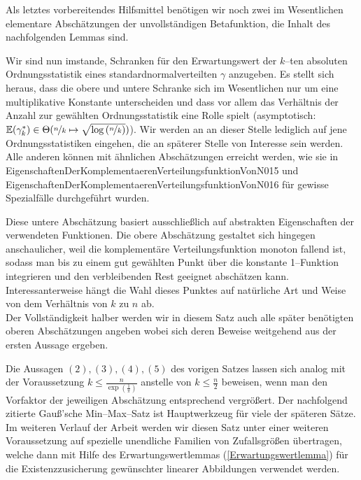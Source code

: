 \documentclass[a4paper]{report}
\numberwithin[\roman]{equation}{sat}
\begin{document}

\parag
Als letztes vorbereitendes Hilfsmittel benötigen wir noch zwei im Wesentlichen
elementare Abschätzungen der unvollständigen Betafunktion, die Inhalt des
nachfolgenden Lemmas sind.


\parag
Wir sind nun imstande, Schranken für den Erwartungswert der $k$--ten absoluten
Ordnungsstatistik eines standardnormalverteilten $\gamma$ anzugeben.
Es stellt sich heraus, dass die obere und untere Schranke sich im Wesentlichen nur um
eine multiplikative Konstante unterscheiden und dass vor allem das Verhältnis
der Anzahl zur gewählten Ordnungsstatistik eine Rolle spielt (asymptotisch:
$\mathbb{E}(\gamma_k^\ast) \in \Theta(\nicefrac n k \mapsto
\sqrt{\log\left(\nicefrac n k \right)})$). Wir werden an
an dieser Stelle lediglich auf jene Ordnungsstatistiken eingehen, die an
späterer Stelle von Interesse sein werden. Alle anderen können mit ähnlichen
Abschätzungen erreicht werden, wie sie in
{EigenschaftenDerKomplementaerenVerteilungsfunktionVonN015} und
{EigenschaftenDerKomplementaerenVerteilungsfunktionVonN016} für gewisse
Spezialfälle durchgeführt wurden.


\parag
Diese untere Abschätzung basiert ausschließlich auf abstrakten Eigenschaften
der verwendeten Funktionen. Die obere Abschätzung gestaltet sich hingegen
anschaulicher, weil die komplementäre Verteilungsfunktion monoton fallend ist,
sodass man bis zu einem gut gewählten Punkt über die konstante 1--Funktion
integrieren und den verbleibenden Rest geeignet abschätzen kann.
Interessanterweise hängt die Wahl dieses Punktes auf natürliche Art und Weise
von dem Verhältnis von $k$ zu $n$ ab.\\
Der Vollständigkeit halber werden wir in diesem Satz auch alle später
benötigten oberen Abschätzungen angeben wobei sich deren Beweise weitgehend
aus der ersten Aussage ergeben.



Die Aussagen $(2), (3), (4), (5)$ des vorigen Satzes lassen sich analog mit
der Voraussetzung $k \le \frac n {\exp(\frac 1 \pi)}$ anstelle von
$k \le \frac n 2$ beweisen, wenn man den Vorfaktor der jeweiligen Abschätzung
entsprechend vergrößert.\parag
Der nachfolgend zitierte Gauß'sche Min--Max--Satz ist Hauptwerkzeug für viele
der späteren Sätze. Im weiteren Verlauf der Arbeit werden wir diesen Satz unter
einer weiteren Voraussetzung auf spezielle unendliche Familien von
Zufallsgrößen übertragen, welche dann mit Hilfe des Erwartungswertlemmas
(\ref{Erwartungswertlemma}) für die Existenzzusicherung gewünschter linearer
Abbildungen verwendet werden.
\newpage

\end{document}
